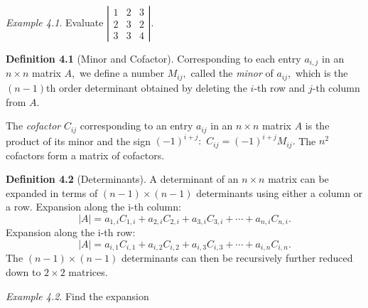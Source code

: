 \documentclass[
  letterpaper,
  DIV=11,
  numbers=noendperiod]{scrartcl}
\theoremstyle{remark}
\begin{document}
\emph{Example 4.1}. Evaluate \(\left|
\begin{array}{ccc}
1 & 2 & 3 \\
2 & 3 & 2 \\
3 & 3 & 4
\end{array}
\right| .\)

\textbf{Definition 4.1} (Minor and Cofactor). Corresponding to each
entry \(a_{i,j}\) in an \(n\times n\) matrix \(A,\) we define a number
\(M_{ij},\) called the \emph{minor} of \(a_{ij},\) which is the
\(\left( n-1\right)\)th order determinant obtained by deleting the
\(i\)-th row and \(j\)-th column from \(A.\)

The \emph{cofactor} \(C_{ij}\) corresponding to an entry \(a_{ij}\) in
an \(n\times n\) matrix \(A\) is the product of its minor and the sign
\(\left( -1\right) ^{i+j}:\) \(C_{ij}=\left( -1\right) ^{i+j}M_{ij}.\)
The \(n^{2}\) cofactors form a matrix of cofactors.

\label{detdefn}
\textbf{Definition 4.2} (Determinants). A determinant of an
\(n \times n\) matrix can be expanded in terms of \((n-1)\times(n-1)\)
determinants using either a column or a row. Expansion along the i-th
column:
\[\left| A\right| =a_{1,i}C_{1,i}+a_{2,i}C_{2,i}+a_{3,i}C_{3,i}+\cdots
+a_{n,i}C_{n,i}.\] Expansion along the i-th row:
\[\left| A\right| =a_{i,1}C_{i,1}+a_{i,2}C_{i,2}+a_{i,3}C_{i,3}+\cdots
+a_{i,n}C_{i,n}.\] The \((n-1)\times(n-1)\) determinants can then be
recursively further reduced down to \(2\times2\) matrices.

\emph{Example 4.2}. Find the expansion
\end{document}
